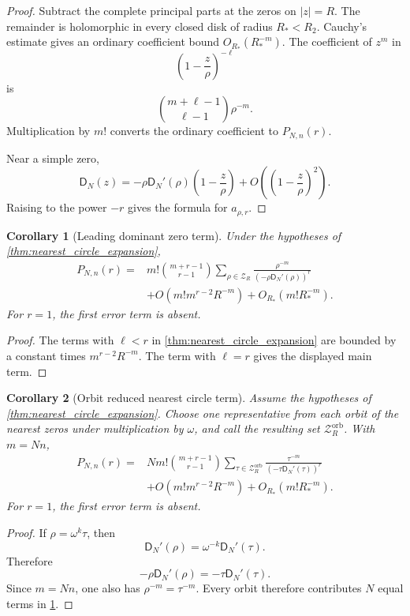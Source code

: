 \documentclass{aomart}
\newtheorem{corollary}[corollary]{Corollary}
\theoremstyle{definition}
\theoremstyle{remark}
\newcommand{\Zcal}{\mathcal Z}
\newcommand{\Dfun}{\mathsf D}
\begin{document}
\begin{proof}
Subtract the complete principal parts at the zeros on $|z|=R$.  The remainder is holomorphic in every closed disk of radius $R_*<R_2$.  Cauchy's estimate gives an ordinary coefficient bound $O_{R_*}(R_*^{-m})$.  The coefficient of $z^m$ in
\[
\left(1-\frac z\rho\right)^{-\ell}
\]
is
\[
\binom{m+\ell-1}{\ell-1}\rho^{-m}.
\]
Multiplication by $m!$ converts the ordinary coefficient to $P_{N,n}(r)$.

Near a simple zero,
\[
\Dfun_N(z)
=
-\rho\Dfun_N'(\rho)
\left(1-\frac z\rho\right)
+O\left(\left(1-\frac z\rho\right)^2\right).
\]
Raising to the power $-r$ gives the formula for $a_{\rho,r}$.
\end{proof}

\begin{corollary}[Leading dominant zero term]\label{cor:leading_dominant_zero}
Under the hypotheses of \cref{thm:nearest_circle_expansion},
\[
\begin{aligned}
P_{N,n}(r)
={}&m!\binom{m+r-1}{r-1}
\sum_{\rho\in\Zcal_R}
\frac{\rho^{-m}}{(-\rho\Dfun_N'(\rho))^r}
\\
&+O\left(m!m^{r-2}R^{-m}\right)
+O_{R_*}\left(m!R_*^{-m}\right).
\end{aligned}
\]
For $r=1$, the first error term is absent.
\end{corollary}

\begin{proof}
The terms with $\ell<r$ in \cref{thm:nearest_circle_expansion} are bounded by a constant times $m^{r-2}R^{-m}$.  The term with $\ell=r$ gives the displayed main term.
\end{proof}


\begin{corollary}[Orbit reduced nearest circle term]\label{cor:orbit_reduced_asymptotic}
Assume the hypotheses of \cref{thm:nearest_circle_expansion}.  Choose one representative from each orbit of the nearest zeros under multiplication by $\omega$, and call the resulting set $\Zcal_R^{\mathrm{orb}}$.  With $m=Nn$,
\[
\begin{aligned}
P_{N,n}(r)
={}&N m!\binom{m+r-1}{r-1}
\sum_{\tau\in\Zcal_R^{\mathrm{orb}}}
\frac{\tau^{-m}}{(-\tau\Dfun_N'(\tau))^r}
\\
&+O\left(m!m^{r-2}R^{-m}\right)
+O_{R_*}\left(m!R_*^{-m}\right).
\end{aligned}
\]
For $r=1$, the first error term is absent.
\end{corollary}

\begin{proof}
If $\rho=\omega^k\tau$, then
\[
\Dfun_N'(\rho)=\omega^{-k}\Dfun_N'(\tau).
\]
Therefore
\[
-\rho\Dfun_N'(\rho)
=-\tau\Dfun_N'(\tau).
\]
Since $m=Nn$, one also has $\rho^{-m}=\tau^{-m}$.  Every orbit therefore contributes $N$ equal terms in \cref{cor:leading_dominant_zero}.
\end{proof}
\end{document}
